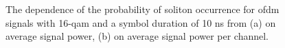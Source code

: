 \begin{figure}[htpb]
    \begin{minipage}[h]{0.47\linewidth}
    \end{minipage}
    \hfill
    \begin{minipage}[h]{0.47\linewidth}
    \end{minipage}

    \caption{The dependence of the probability of soliton occurrence for \acrshort{ofdm} signals with 16-\acrshort{qam} and a symbol duration of 10 ns from (a) on average signal power, (b) on average signal power per channel.}
    \label{fig:ofdm_result_16qam}
\end{figure}

